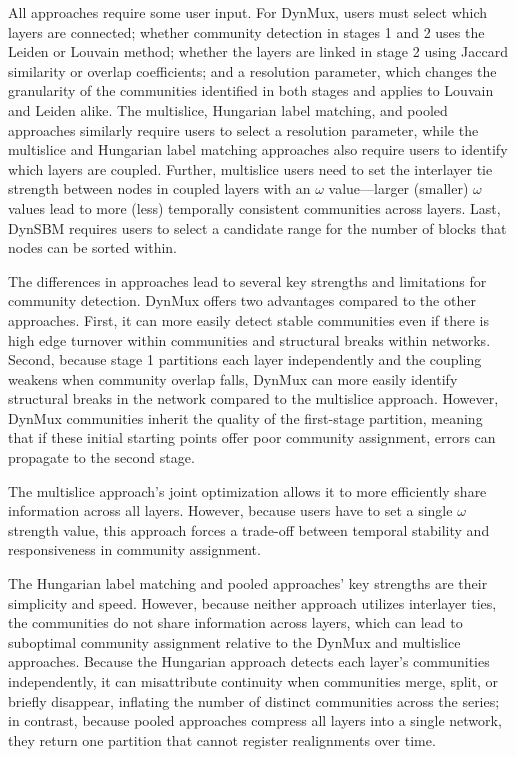 \documentclass[11pt, letterpaper]{article}
\begin{document}
All approaches require some user input. For DynMux, users must select which layers are connected; whether community detection in stages 1 and 2 uses the Leiden or Louvain method; whether the layers are linked in stage 2 using Jaccard similarity or overlap coefficients; and a resolution parameter, which changes the granularity of the communities identified in both stages and applies to Louvain and Leiden alike. The multislice, Hungarian label matching, and pooled approaches similarly require users to select a resolution parameter, while the multislice and Hungarian label matching approaches also require users to identify which layers are coupled. Further, multislice users need to set the interlayer tie strength between nodes in coupled layers with an $\omega$ value---larger (smaller) $\omega$ values lead to more (less) temporally consistent communities across layers. Last, DynSBM requires users to select a candidate range for the number of blocks that nodes can be sorted within.

The differences in approaches lead to several key strengths and limitations for community detection. DynMux offers two advantages compared to the other approaches. First, it can more easily detect stable communities even if there is high edge turnover within communities and structural breaks within networks. Second, because stage 1 partitions each layer independently and the coupling weakens when community overlap falls, DynMux can more easily identify structural breaks in the network compared to the multislice approach. However, DynMux communities inherit the quality of the first-stage partition, meaning that if these initial starting points offer poor community assignment, errors can propagate to the second stage.

The multislice approach's joint optimization allows it to more efficiently share information across all layers. However, because users have to set a single $\omega$ strength value, this approach forces a trade-off between temporal stability and responsiveness in community assignment.

The Hungarian label matching and pooled approaches' key strengths are their simplicity and speed. However, because neither approach utilizes interlayer ties, the communities do not share information across layers, which can lead to suboptimal community assignment relative to the DynMux and multislice approaches. Because the Hungarian approach detects each layer's communities independently, it can misattribute continuity when communities merge, split, or briefly disappear, inflating the number of distinct communities across the series; in contrast, because pooled approaches compress all layers into a single network, they return one partition that cannot register realignments over time.
\end{document}
